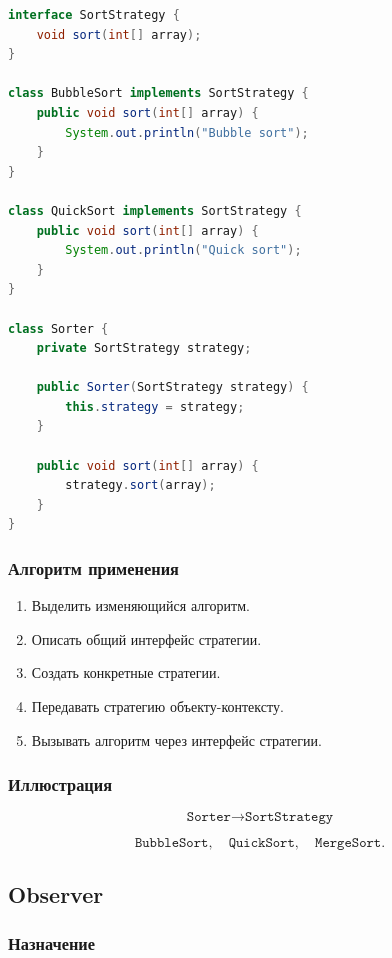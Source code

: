 \documentclass[12pt,a4paper]{article}
\begin{document}
\begin{lstlisting}[language=Java,caption={Strategy}]
interface SortStrategy {
    void sort(int[] array);
}

class BubbleSort implements SortStrategy {
    public void sort(int[] array) {
        System.out.println("Bubble sort");
    }
}

class QuickSort implements SortStrategy {
    public void sort(int[] array) {
        System.out.println("Quick sort");
    }
}

class Sorter {
    private SortStrategy strategy;

    public Sorter(SortStrategy strategy) {
        this.strategy = strategy;
    }

    public void sort(int[] array) {
        strategy.sort(array);
    }
}
\end{lstlisting}

\subsubsection{Алгоритм применения}

\begin{enumerate}
    \item Выделить изменяющийся алгоритм.
    \item Описать общий интерфейс стратегии.
    \item Создать конкретные стратегии.
    \item Передавать стратегию объекту-контексту.
    \item Вызывать алгоритм через интерфейс стратегии.
\end{enumerate}

\subsubsection{Иллюстрация}

\[
\texttt{Sorter} \rightarrow \texttt{SortStrategy}
\]

\[
\texttt{BubbleSort}, \quad \texttt{QuickSort}, \quad \texttt{MergeSort}.
\]

\subsection{Observer}

\subsubsection{Назначение}
\end{document}
